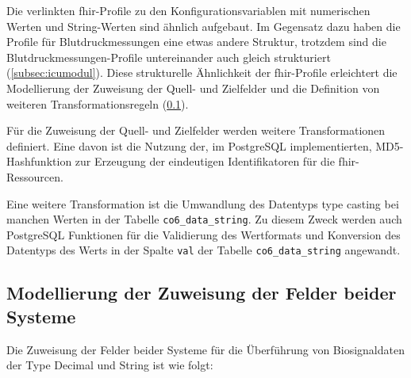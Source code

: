 Die verlinkten \ac{fhir}-Profile zu den Konfigurationsvariablen mit numerischen Werten und String-Werten sind ähnlich aufgebaut. Im Gegensatz dazu haben die Profile für Blutdruckmessungen eine etwas andere Struktur, trotzdem sind die Blutdruckmessungen-Profile untereinander auch gleich strukturiert (\ref{subsec:icumodul}). Diese strukturelle Ähnlichkeit der \ac{fhir}-Profile erleichtert die Modellierung der Zuweisung der Quell- und Zielfelder und die Definition von weiteren Transformationsregeln (\ref{subsec:modellinksystems}).

Für die Zuweisung der Quell- und Zielfelder werden weitere Transformationen definiert. Eine davon ist die Nutzung der, im PostgreSQL implementierten, MD5-Hashfunktion zur Erzeugung der eindeutigen Identifikatoren für die \ac{fhir}-Ressourcen. 

Eine weitere Transformation ist die Umwandlung des Datentyps \glqq type casting\grqq{} bei manchen Werten in der Tabelle \texttt{co6\_data\_string}. Zu diesem Zweck werden auch PostgreSQL Funktionen für die Validierung des Wertformats und Konversion des Datentyps des Werts in der Spalte \texttt{val} der Tabelle \texttt{co6\_data\_string} angewandt.

\subsection{Modellierung der Zuweisung der Felder beider Systeme} \label{subsec:modellinksystems}

Die Zuweisung der Felder beider Systeme für die Überführung von Biosignaldaten der Type \glqq Decimal\grqq{} und \glqq String\grqq{} ist wie folgt:
\vspace{4mm}

